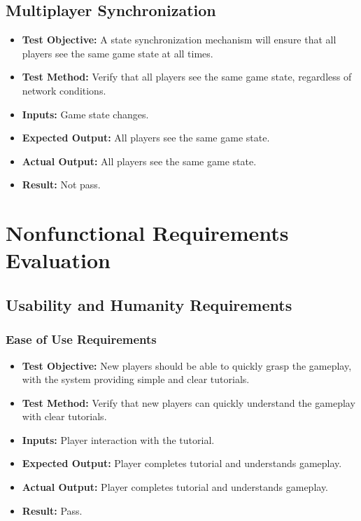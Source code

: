 \documentclass[12pt, titlepage]{article}
\begin{document}
\subsection{Multiplayer Synchronization}
\begin{itemize}
    \item \textbf{Test Objective:} A state synchronization mechanism will ensure that all players see the same game state at all times.
    \item \textbf{Test Method:} Verify that all players see the same game state, regardless of network conditions.
    \item \textbf{Inputs:} Game state changes.
    \item \textbf{Expected Output:} All players see the same game state.
    \item \textbf{Actual Output:} All players see the same game state.
    \item \textbf{Result:} Not pass.
\end{itemize}

\newpage

\section{Nonfunctional Requirements Evaluation}

\subsection{Usability and Humanity Requirements}

\subsubsection{Ease of Use Requirements}
\begin{itemize}
    \item \textbf{Test Objective:} New players should be able to quickly grasp the gameplay, with the system providing simple and clear tutorials.
    \item \textbf{Test Method:} Verify that new players can quickly understand the gameplay with clear tutorials.
    \item \textbf{Inputs:} Player interaction with the tutorial.
    \item \textbf{Expected Output:} Player completes tutorial and understands gameplay.
    \item \textbf{Actual Output:} Player completes tutorial and understands gameplay.
    \item \textbf{Result:} Pass.
\end{itemize}
\end{document}
